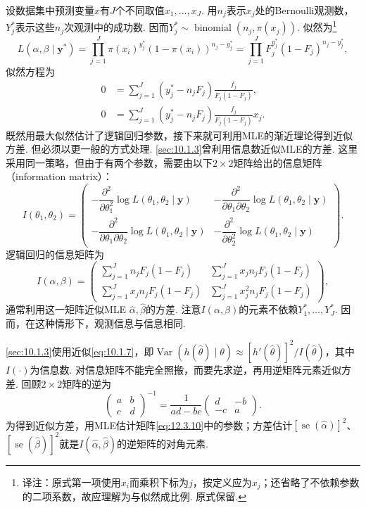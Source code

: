 设数据集中预测变量$x$有$J$个不同取值$x_1,\ldots,x_J$. 用$n_j$表示$x_j$处的Bernoulli观测数，$Y_j^*$表示这些$n_j$次观测中的成功数. 因而$Y_j^*\sim\operatorname{binomial}(n_j,\pi(x_j))$. 似然为\footnote{译注：原式第一项使用$x_i$而乘积下标为$j$，按定义应为$x_j$；还省略了不依赖参数的二项系数，故应理解为与似然成比例. 原式保留.}
$$L(\alpha,\beta\mid\boldsymbol y^*)=\prod_{j=1}^J\pi(x_i)^{y_j^*}(1-\pi(x_i))^{n_j-y_j^*}
=\prod_{j=1}^JF_j^{y_j^*}(1-F_j)^{n_j-y_j^*},$$
似然方程为
$$\begin{aligned}
0&=\sum_{j=1}^J(y_j^*-n_jF_j)\frac{f_j}{F_j(1-F_j)},\\
0&=\sum_{j=1}^J(y_j^*-n_jF_j)\frac{f_j}{F_j(1-F_j)}x_j.
\end{aligned}$$
既然用最大似然估计了逻辑回归参数，接下来就可利用MLE的渐近理论得到近似方差. 但必须以更一般的方式处理. \autoref{sec:10.1.3}曾利用信息数近似MLE的方差. 这里采用同一策略，但由于有两个参数，需要由以下$2\times2$矩阵给出的信息矩阵（information matrix）：
\begin{equation}\label{eq:12.3.9}
I(\theta_1,\theta_2)=\begin{pmatrix}
-\dfrac{\partial^2}{\partial\theta_1^2}\log L(\theta_1,\theta_2\mid\boldsymbol y)&
-\dfrac{\partial^2}{\partial\theta_1\partial\theta_2}\log L(\theta_1,\theta_2\mid\boldsymbol y)\\
-\dfrac{\partial^2}{\partial\theta_1\partial\theta_2}\log L(\theta_1,\theta_2\mid\boldsymbol y)&
-\dfrac{\partial^2}{\partial\theta_2^2}\log L(\theta_1,\theta_2\mid\boldsymbol y)
\end{pmatrix}.
\end{equation}
逻辑回归的信息矩阵为
\begin{equation}\label{eq:12.3.10}
I(\alpha,\beta)=\begin{pmatrix}
\sum_{j=1}^Jn_jF_j(1-F_j)&\sum_{j=1}^Jx_jn_jF_j(1-F_j)\\
\sum_{j=1}^Jx_jn_jF_j(1-F_j)&\sum_{j=1}^Jx_j^2n_jF_j(1-F_j)
\end{pmatrix},
\end{equation}
通常利用这一矩阵近似MLE $\hat\alpha,\hat\beta$的方差. 注意$I(\alpha,\beta)$的元素不依赖$Y_1^*,\ldots,Y_J^*$. 因而，在这种情形下，观测信息与信息相同.

\autoref{sec:10.1.3}使用近似\eqref{eq:10.1.7}，即$\operatorname{Var}(h(\hat\theta)\mid\theta)\approx[h'(\hat\theta)]^2/I(\hat\theta)$，其中$I(\cdot)$为信息数. 对信息矩阵不能完全照搬，而要先求逆，再用逆矩阵元素近似方差. 回顾$2\times2$矩阵的逆为
$$\begin{pmatrix}a&b\\c&d\end{pmatrix}^{-1}
=\frac1{ad-bc}\begin{pmatrix}d&-b\\-c&a\end{pmatrix}.$$
为得到近似方差，用MLE估计矩阵\eqref{eq:12.3.10}中的参数；方差估计$[\operatorname{se}(\hat\alpha)]^2$、$[\operatorname{se}(\hat\beta)]^2$就是$I(\hat\alpha,\hat\beta)$的逆矩阵的对角元素.

